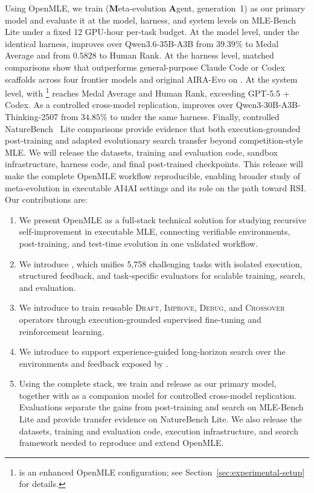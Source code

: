Using OpenMLE, we train \textbf{\thirtyfivebmodel{}}
(\textbf{M}eta-evolution \textbf{A}gent, generation~1) as our primary
model and evaluate it at the model, harness, and system levels on MLE-Bench Lite under a fixed 12 GPU-hour per-task budget. At the model level, under the identical \openmleevo{} harness, \thirtyfivebmodel{} improves over Qwen3.6-35B-A3B from $39.39\%$ to \frontisThirtyFiveEvoResult{} Medal Average and from $0.5828$ to \frontisThirtyFiveEvoHumanRank{} Human Rank. At the harness level, matched comparisons show that \openmleevo{} outperforms general-purpose Claude Code or Codex scaffolds across four frontier models and original AIRA-Evo on \thirtyfivebmodel{}. At the system level, \thirtyfivebmodel{} with \openmleevomax{}\footnote{\openmleevomax{} is an enhanced OpenMLE configuration; see Section~\ref{sec:experimental-setup} for details.} reaches \frontisThirtyFiveEvoMaxResult{} Medal Average and \frontisThirtyFiveEvoMaxHumanRank{} Human Rank, exceeding GPT-5.5 + Codex. As a controlled cross-model replication, \thirtybmodel{} improves over Qwen3-30B-A3B-Thinking-2507 from $34.85\%$ to \frontisThirtyEvoResult{} under the same \openmleevo{} harness. Finally, controlled NatureBench~\citep{wang2026naturebench} Lite comparisons provide evidence that both execution-grounded post-training and adapted evolutionary search transfer beyond competition-style MLE.
We will release the datasets, training and evaluation code, sandbox infrastructure, harness code, and final post-trained checkpoints. This release will make the complete OpenMLE workflow reproducible, enabling broader study of meta-evolution in executable AI4AI settings and its role on the path toward RSI. Our contributions are:
\begin{enumerate}[leftmargin=*,itemsep=2pt,topsep=0pt,partopsep=0pt,parsep=0pt]
\item We present OpenMLE as a full-stack technical solution for studying recursive self-improvement in executable MLE, connecting verifiable environments, post-training, and test-time evolution in one validated workflow.
\item We introduce \openmlegym{}, which unifies 5,758 challenging tasks with isolated execution, structured feedback, and task-specific evaluators for scalable training, search, and evaluation.
\item We introduce \openmleerl{} to train reusable \textsc{Draft}, \textsc{Improve}, \textsc{Debug}, and \textsc{Crossover} operators through execution-grounded supervised fine-tuning and reinforcement learning.
\item We introduce \openmleevo{} to support experience-guided long-horizon search over the environments and feedback exposed by \openmlegym{}.
\item Using the complete stack, we train and release \thirtyfivebmodel{} as our primary model, together with \thirtybmodel{} as a companion model for controlled cross-model replication. Evaluations separate the gains from post-training and search on MLE-Bench Lite and provide transfer evidence on NatureBench Lite. We also release the datasets, training and evaluation code, execution infrastructure, and search framework needed to reproduce and extend OpenMLE.
\end{enumerate}

